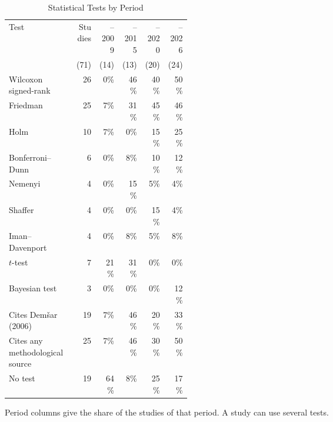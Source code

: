 \begin{table}[t]
  \caption{Statistical Tests by Period}
  \label{tab:empirical-tests-era}
  \footnotesize
  \setlength{\tabcolsep}{4pt}
  \begin{tabular}{@{}>{\raggedright\arraybackslash}p{0.36\linewidth}rrrrr@{}}
    \toprule
    Test & Studies & --2009 & --2015 & --2020 & --2026\\
    & (71) & (14) & (13) & (20) & (24)\\
    \midrule
    Wilcoxon signed-rank & 26 & 0\% & 46\% & 40\% & 50\%\\
    Friedman & 25 & 7\% & 31\% & 45\% & 46\%\\
    Holm & 10 & 7\% & 0\% & 15\% & 25\%\\
    Bonferroni--Dunn & 6 & 0\% & 8\% & 10\% & 12\%\\
    Nemenyi & 4 & 0\% & 15\% & 5\% & 4\%\\
    Shaffer & 4 & 0\% & 0\% & 15\% & 4\%\\
    Iman--Davenport & 4 & 0\% & 8\% & 5\% & 8\%\\
    $t$-test & 7 & 21\% & 31\% & 0\% & 0\%\\
    Bayesian test & 3 & 0\% & 0\% & 0\% & 12\%\\
    \midrule
    Cites Demšar (2006) & 19 & 7\% & 46\% & 20\% & 33\%\\
    Cites any methodological source & 25 & 7\% & 46\% & 30\% & 50\%\\
    No test & 19 & 64\% & 8\% & 25\% & 17\%\\
    \bottomrule
  \end{tabular}
  \par\smallskip\raggedright\scriptsize Period columns give the share of the studies of that period. A study can use several tests.
\end{table}
